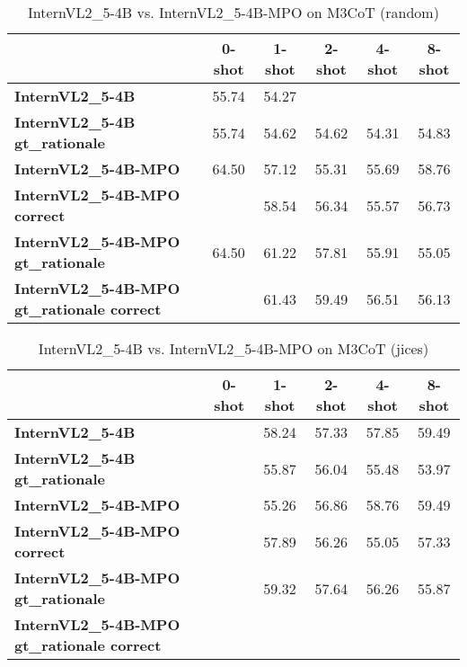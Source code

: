 \begin{table}
\caption{InternVL2\_5-4B vs. InternVL2\_5-4B-MPO on M3CoT (random)}
\label{tab:InternVL2_5-4B_M3CoT_TRAIN_random}
\begin{tabular}{lccccc}
\toprule
 & 0-shot & 1-shot & 2-shot & 4-shot & 8-shot \\
\midrule
\textbf{InternVL2\_5-4B} & 55.74 & 54.27 &  &  &  \\
\textbf{InternVL2\_5-4B gt\_rationale} & 55.74 & 54.62 & 54.62 & 54.31 & 54.83 \\
\textbf{InternVL2\_5-4B-MPO} & 64.50 & 57.12 & 55.31 & 55.69 & 58.76 \\
\textbf{InternVL2\_5-4B-MPO correct} &  & 58.54 & 56.34 & 55.57 & 56.73 \\
\textbf{InternVL2\_5-4B-MPO gt\_rationale} & 64.50 & 61.22 & 57.81 & 55.91 & 55.05 \\
\textbf{InternVL2\_5-4B-MPO gt\_rationale correct} &  & 61.43 & 59.49 & 56.51 & 56.13 \\
\bottomrule
\end{tabular}
\end{table}


\begin{table}
\caption{InternVL2\_5-4B vs. InternVL2\_5-4B-MPO on M3CoT (jices)}
\label{tab:InternVL2_5-4B_M3CoT_TRAIN_jices}
\begin{tabular}{lccccc}
\toprule
 & 0-shot & 1-shot & 2-shot & 4-shot & 8-shot \\
\midrule
\textbf{InternVL2\_5-4B} &  & 58.24 & 57.33 & 57.85 & 59.49 \\
\textbf{InternVL2\_5-4B gt\_rationale} &  & 55.87 & 56.04 & 55.48 & 53.97 \\
\textbf{InternVL2\_5-4B-MPO} &  & 55.26 & 56.86 & 58.76 & 59.49 \\
\textbf{InternVL2\_5-4B-MPO correct} &  & 57.89 & 56.26 & 55.05 & 57.33 \\
\textbf{InternVL2\_5-4B-MPO gt\_rationale} &  & 59.32 & 57.64 & 56.26 & 55.87 \\
\textbf{InternVL2\_5-4B-MPO gt\_rationale correct} &  &  &  &  &  \\
\bottomrule
\end{tabular}
\end{table}


